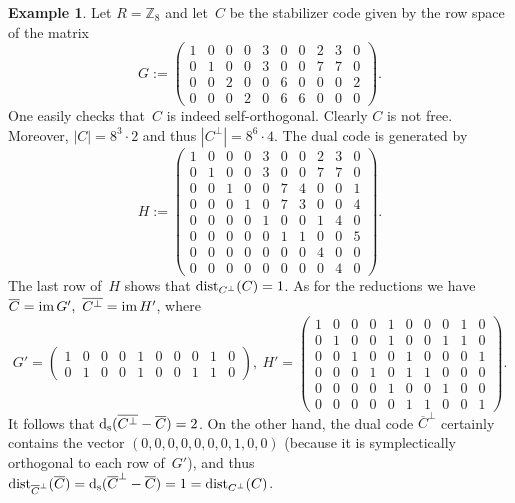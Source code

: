 \documentclass[11pt]{article}
\theoremstyle{definition}
\newtheorem{exa}[theo]{Example}
\numberwithin{equation}{section}
\newcommand{\Z}{{\mathbb Z}}
\newcommand{\im}{\mbox{\rm im}\,}
\newcommand{\ds}{\mbox{${\rm d}_{\rm s}$}}
\newcommand{\ov}[1]{\mbox{$\overline{#1}$}}
\newcommand{\dist}{\textup{dist}}
\begin{document}
\begin{exa}\label{E-Z8NonFree}
Let $R = \Z_8$ and let~$C$ be the stabilizer code given by the row space of the matrix
\[
	G:=\left(
		\begin{array}{ccccc|ccccc}
         1&0&0&0&3&0&0&2&3&0\\0&1&0&0&3&0&0&7&7&0\\0&0&2&0&0&6&0&0&0&2\\
         0&0&0&2&0&6&6&0&0&0\end{array}\right).
\]
One easily checks that~$C$ is indeed self-orthogonal. Clearly $C$ is not free.
Moreover, $|C| = 8^3\cdot 2$ and thus $|C^{\perp}|=8^6\cdot4$. The dual code is generated by
\[
  H:=\left(\begin{array}{ccccc|ccccc}
       1&0&0&0&3&0&0&2&3&0\\0&1&0&0&3&0&0&7&7&0\\0&0&1&0&0&7&4&0&0&1\\0&0&0&1&0&7&3&0&0&4\\0&0&0&0&1&0&0&1&4&0\\
       0&0&0&0&0&1&1&0&0&5\\0&0&0&0&0&0&0&4&0&0\\0&0&0&0&0&0&0&0&4&0\end{array}\right).
\]
The last row of~$H$ shows that $\dist_{C^\perp}(C)=1$.
As for the reductions we have $\ov{C}=\im G',\ \ov{C^\perp}=\im H'$, where
\[
  G'=\left(
		\begin{array}{ccccc|ccccc}
         1&0&0&0&1&0&0&0&1&0\\0&1&0&0&1&0&0&1&1&0\end{array}\right),\
  H'=\left(
		\begin{array}{ccccc|ccccc}
         1&0&0&0&1&0&0&0&1&0\\0&1&0&0&1&0&0&1&1&0\\0&0&1&0&0&1&0&0&0&1\\0&0&0&1&0&1&1&0&0&0\\0&0&0&0&1&0&0&1&0&0\\0&0&0&0&0&1&1&0&0&1
         \end{array}\right).
\]
It follows that $\ds(\ov{C^\perp}-\ov{C})=2$.
On the other hand, the dual code $\ov{C}^\perp$ certainly contains the vector $(0,0,0,0,0,0,0,1,0,0)$ (because it is symplectically orthogonal to each row of~$G'$), and thus
$\dist_{\small{\overline{C}^\perp}}(\ov{C})=\ds(\ov{C}^\perp-\ov{C})=1=\dist_{C^\perp}(C)$.
\end{exa}
\end{document}
